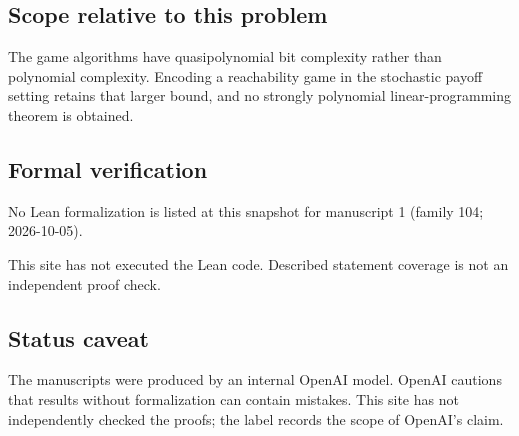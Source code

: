 \documentclass[11pt]{article}
\begin{document}
\subsection{Scope relative to this problem}
The game algorithms have quasipolynomial bit complexity rather than polynomial complexity. Encoding a reachability game in the stochastic payoff setting retains that larger bound, and no strongly polynomial linear-programming theorem is obtained.

\subsection{Formal verification}
No Lean formalization is listed at this snapshot for manuscript 1 (family 104; 2026-10-05).

This site has not executed the Lean code. Described statement coverage is not an independent proof check.

\subsection{Status caveat}
The manuscripts were produced by an internal OpenAI model. OpenAI cautions that results without formalization can contain mistakes. This site has not independently checked the proofs; the label records the scope of OpenAI's claim.
\end{document}
